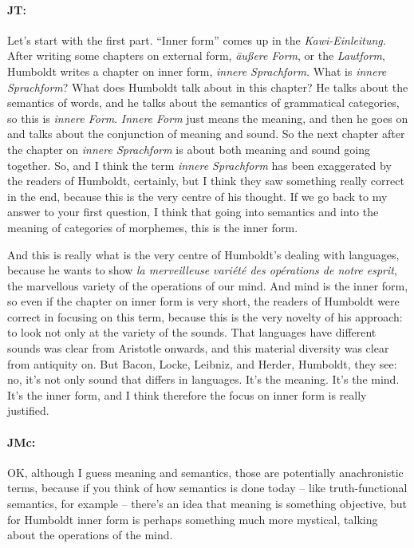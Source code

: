 \documentclass[output=paper]{langscibook}
\begin{document}
\paragraph*{JT:} Let’s start with the first part. “Inner form” comes up in the \textit{Kawi-Einleitung.} After writing some chapters on external form, \textit{äußere Form}, or the \textit{Lautform}, Humboldt writes a chapter on inner form, \textit{innere Sprachform.} What is \textit{innere Sprachform}? What does Humboldt talk about in this chapter? He talks about the semantics of words, and he talks about the semantics of grammatical categories, so this is \textit{innere Form}. \textit{Innere Form} just means the meaning, and then he goes on and talks about the conjunction of meaning and sound. So the next chapter after the chapter on \textit{innere Sprachform} is about both meaning and sound going together. So, and I think the term \textit{innere Sprachform} has been exaggerated by the readers of Humboldt, certainly, but I think they saw something really correct in the end, because this is the very centre of his thought. If we go back to my answer to your first question, I think that going into semantics and into the meaning of categories of morphemes, this is the inner form.

And this is really what is the very centre of Humboldt’s dealing with languages, because he wants to show \textit{la merveilleuse variété des opérations de notre esprit}, the marvellous variety of the operations of our mind. And mind is the inner form, so even if the chapter on inner form is very short, the readers of Humboldt were correct in focusing on this term, because this is the very novelty of his approach: to look not only at the variety of the sounds. That languages have different sounds was clear from Aristotle onwards, and this material diversity was clear from antiquity on. But  Bacon, Locke, Leibniz, and Herder, Humboldt, they see: no, it’s not only sound that differs in languages. It’s the meaning. It’s the mind. It’s the inner form, and I think therefore the focus on inner form is really justified.


\paragraph*{JMc:} OK, although I guess meaning and semantics, those are potentially anachronistic terms, because if you think of how semantics is done today – like truth-functional semantics, for example – there’s an idea that meaning is something objective, but for Humboldt inner form is perhaps something much more mystical, talking about the operations of the mind.
\end{document}
